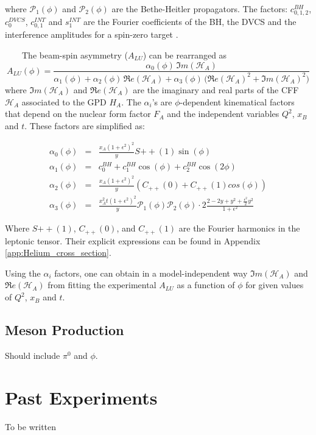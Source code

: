 where $\mathcal{P}_1(\phi)$ and $\mathcal {P}_2(\phi)$ are the Bethe-Heitler 
propagators. The factors: $c_{0,1,2}^{BH}$, $c_0^{DVCS}$, $c_{0,1}^{INT}$ and 
$s_1^{INT}$ are the Fourier coefficients of the BH, the DVCS and the 
interference amplitudes for a spin-zero target \cite{Kirchner:2003wt}.

~~~~The beam-spin asymmetry ($A_{LU}$) can be rearranged as
\begin{equation}
A_{LU}(\phi) = \frac{\alpha_{0}(\phi) \, \Im m(\mathcal{H}_{A})}
{\alpha_{1}(\phi) + \alpha_{2}(\phi) \, \Re e(\mathcal{H}_{A}) + \alpha_{3}(\phi) \, 
\big( 
\Re e(\mathcal{H}_{A})^{2} + \Im m(\mathcal{H}_{A})^{2} \big)}
\label{eq:A_LU-coh}
\end{equation}
where $\Im m(\mathcal{H}_{A})$ and $\Re e(\mathcal{H}_{A})$ are the imaginary 
and real parts of the CFF $\mathcal{H}_{A}$ associated to the GPD $H_A$. The 
$\alpha_{i}$'s are $\phi$-dependent kinematical factors that depend on the 
nuclear form factor $F_A$ and the independent variables $Q^2$, $x_{B}$ and $t$.  
These factors are simplified as:

\small
\begin{eqnarray}
   \alpha_0 (\phi) & = &\frac{x_{A}(1+\epsilon^2)^2}{y} S{++}(1) \sin(\phi)\\
    \alpha_1 (\phi) & = & c_0^{BH}+c_1^{BH} \cos({\phi})+c_2^{BH} \cos(2\phi)\\ 
   \alpha_2 (\phi) & = & \frac{x_{A}(1+\epsilon^2)^2}{y}  \left( C_{++}(0) +  
C_{++}(1) cos(\phi) \right)\\
\alpha_3 (\phi) &=& \frac{x^{2}_{A}t(1+\epsilon^2)^2}{y} {\mathcal P}_1(\phi) 
{\mathcal P}_2(\phi) \cdot 2 \frac{2-2y+y^2 + \frac{\epsilon^2}{2}y^2}{1 + 
\epsilon^2}
\end{eqnarray}
\normalsize

Where $S{++}(1)$, $C_{++}(0)$, and $C_{++}(1)$ are the Fourier harmonics in the 
leptonic tensor. Their explicit expressions can be found in Appendix 
\ref{app:Helium_cross_section}. 

Using the $\alpha_{i}$ factors, one can obtain in a model-independent way $\Im
m(\mathcal{H}_{A})$ and $\Re e(\mathcal{H}_{A})$ from fitting the experimental 
$A_{LU}$ as a function of $\phi$ for given values of $Q^2$, $x_B$ and $t$.  



\subsection{Meson Production}

Should include $\pi^0$ and $\phi$.

\section{Past Experiments}
To be written

